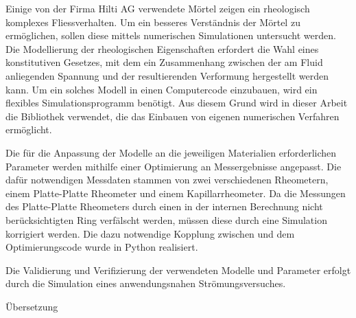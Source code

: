 \thispagestyle{empty}
\begin{abstr}
Einige von der Firma Hilti AG verwendete Mörtel zeigen ein rheologisch komplexes Fliessverhalten. Um ein besseres Verständnis der Mörtel zu ermöglichen, sollen diese mittels numerischen Simulationen untersucht werden.
Die Modellierung der rheologischen Eigenschaften erfordert die Wahl eines konstitutiven Gesetzes, mit dem ein Zusammenhang zwischen der am Fluid anliegenden Spannung und der resultierenden Verformung hergestellt werden kann.
Um ein solches Modell in einen Computercode einzubauen, wird ein flexibles Simulationsprogramm benötigt.
Aus diesem Grund wird in dieser Arbeit die Bibliothek \openfoam{} verwendet, die das Einbauen von eigenen numerischen Verfahren ermöglicht.

Die für die Anpassung der Modelle an die jeweiligen Materialien erforderlichen Parameter werden mithilfe einer Optimierung an Messergebnisse angepasst. Die dafür notwendigen Messdaten stammen von zwei verschiedenen Rheometern, einem Platte-Platte Rheometer und einem Kapillarrheometer. Da die Messungen des Platte-Platte Rheometers durch einen in der internen Berechnung nicht berücksichtigten Ring verfälscht werden, müssen diese durch eine Simulation korrigiert werden. Die dazu notwendige Kopplung zwischen \openfoam{} und dem Optimierungscode wurde in Python realisiert.

Die Validierung und Verifizierung der verwendeten Modelle und Parameter erfolgt durch die Simulation eines anwendungsnahen Strömungsversuches.
\end{abstr}
%
%
\begin{abstr}
    \begin{todocontent}
        \1 Übersetzung
    \end{todocontent}
\end{abstr}
%
